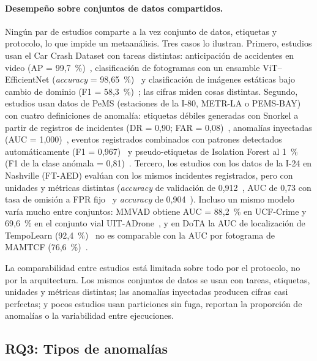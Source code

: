 \documentclass[12pt, a4paper]{article}
\begin{document}


\paragraph{Desempeño sobre conjuntos de datos compartidos.} Ningún par de estudios comparte a la vez conjunto de datos, etiquetas y protocolo, lo que impide un metaanálisis. Tres casos lo ilustran. Primero, \NdsCCD{} estudios usan el Car Crash Dataset con tareas distintas: anticipación de accidentes en video (AP = 99,7~\%)~\cite{guan2025domain}, clasificación de fotogramas con un ensamble ViT--EfficientNet (\textit{accuracy} = 98,65~\%)~\cite{seghir2026real} y clasificación de imágenes estáticas bajo cambio de dominio (F1 = 58,3~\%)~\cite{wu2026feasibility}; las cifras miden cosas distintas. Segundo, \NdsPeMS{} estudios usan datos de PeMS (estaciones de la I-80, METR-LA o PEMS-BAY) con cuatro definiciones de anomalía: etiquetas débiles generadas con Snorkel a partir de registros de incidentes (DR = 0,90; FAR = 0,08)~\cite{sun2022data}, anomalías inyectadas (AUC = 1,000)~\cite{ren2024graph}, eventos registrados combinados con patrones detectados automáticamente (F1 = 0,967)~\cite{duan2025multimodal} y pseudo-etiquetas de Isolation Forest al 1~\% (F1 de la clase anómala = 0,81)~\cite{jadhav2026multistage}. Tercero, los \NdsFTAED{} estudios con los datos de la I-24 en Nashville (FT-AED) evalúan con los mismos incidentes registrados, pero con unidades y métricas distintas (\textit{accuracy} de validación de 0,912~\cite{aslam2025enhancing}, AUC de 0,73 con tasa de omisión a FPR fijo~\cite{nouri2026early} y \textit{accuracy} de 0,904~\cite{pu2026swencoder}). Incluso un mismo modelo varía mucho entre conjuntos: MMVAD obtiene AUC = 88,2~\% en UCF-Crime y 69,6~\% en el conjunto vial UIT-ADrone~\cite{biswas2025mmvad}, y en DoTA la AUC de localización de TempoLearn (92,4~\%)~\cite{htun2023tempolearn} no es comparable con la AUC por fotograma de MAMTCF (76,6~\%)~\cite{liang2025memory}.

\begin{hallazgo}
La comparabilidad entre estudios está limitada sobre todo por el protocolo, no por la arquitectura. Los mismos conjuntos de datos se usan con tareas, etiquetas, unidades y métricas distintas; las anomalías inyectadas producen cifras casi perfectas; y pocos estudios usan particiones sin fuga, reportan la proporción de anomalías o la variabilidad entre ejecuciones.
\end{hallazgo}

\subsection{RQ3: Tipos de anomalías}
\end{document}
